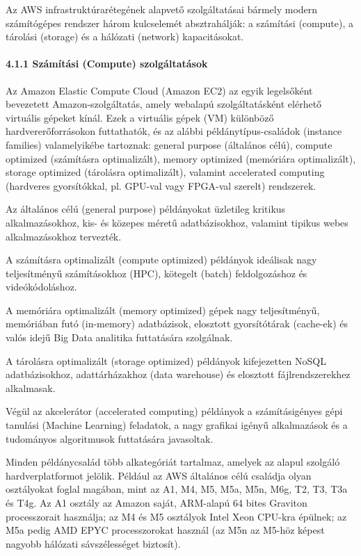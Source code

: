 \documentclass[
]{article}
\begin{document}
Az AWS infrastruktúrarétegének alapvető szolgáltatásai bármely modern
számítógépes rendszer három kulcselemét absztrahálják: a számítási
(compute), a tárolási (storage) és a hálózati (network) kapacitásokat.

\hypertarget{szuxe1muxedtuxe1si-compute-szolguxe1ltatuxe1sok}{%
\paragraph{4.1.1 Számítási (Compute)
szolgáltatások}\label{szuxe1muxedtuxe1si-compute-szolguxe1ltatuxe1sok}}

Az Amazon Elastic Compute Cloud (Amazon EC2) az egyik legelsőként
bevezetett Amazon-szolgáltatás, amely webalapú szolgáltatásként elérhető
virtuális gépeket kínál. Ezek a virtuális gépek (VM) különböző
hardvererőforrásokon futtathatók, és az alábbi példánytípus-családok
(instance families) valamelyikébe tartoznak: general purpose (általános
célú), compute optimized (számításra optimalizált), memory optimized
(memóriára optimalizált), storage optimized (tárolásra optimalizált),
valamint accelerated computing (hardveres gyorsítókkal, pl. GPU-val vagy
FPGA-val szerelt) rendszerek.

Az általános célú (general purpose) példányokat üzletileg kritikus
alkalmazásokhoz, kis- és közepes méretű adatbázisokhoz, valamint tipikus
webes alkalmazásokhoz tervezték.

A számításra optimalizált (compute optimized) példányok ideálisak nagy
teljesítményű számításokhoz (HPC), kötegelt (batch) feldolgozáshoz és
videókódoláshoz.

A memóriára optimalizált (memory optimized) gépek nagy teljesítményű,
memóriában futó (in-memory) adatbázisok, elosztott gyorsítótárak
(cache-ek) és valós idejű Big Data analitika futtatására szolgálnak.

A tárolásra optimalizált (storage optimized) példányok kifejezetten
NoSQL adatbázisokhoz, adattárházakhoz (data warehouse) és elosztott
fájlrendszerekhez alkalmasak.

Végül az akcelerátor (accelerated computing) példányok a számításigényes
gépi tanulási (Machine Learning) feladatok, a nagy grafikai igényű
alkalmazások és a tudományos algoritmusok futtatására javasoltak.

Minden példánycsalád több alkategóriát tartalmaz, amelyek az alapul
szolgáló hardverplatformot jelölik. Például az AWS általános célú
családja olyan osztályokat foglal magában, mint az A1, M4, M5, M5a, M5n,
M6g, T2, T3, T3a és T4g. Az A1 osztály az Amazon saját, ARM-alapú 64
bites Graviton processzorait használja; az M4 és M5 osztályok Intel Xeon
CPU-kra épülnek; az M5a pedig AMD EPYC processzorokat használ (az M5n az
M5-höz képest nagyobb hálózati sávszélességet biztosít).
\end{document}
